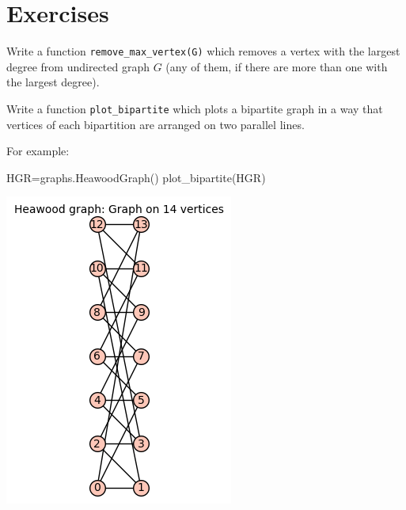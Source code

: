 \section{Exercises}

\begin{exercise}
    Write a function \verb|remove_max_vertex(G)| which removes a vertex with the largest degree from undirected graph $G$ (any of them, if there are more than one with the largest degree).
\end{exercise}
\begin{exercise}
    Write a function \verb|plot_bipartite| which plots a bipartite graph in a way that vertices of each bipartition are arranged on two parallel lines.
\end{exercise}
For example:
\begin{sageCell}
    HGR=graphs.HeawoodGraph()
    plot_bipartite(HGR)
\end{sageCell}
\begin{outImage}
    \includegraphics[width=0.4\linewidth]{Images/Introduction/output_bipartite.png}
\end{outImage}

